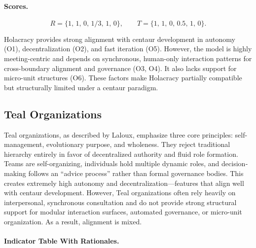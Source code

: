 \documentclass[11pt, a4paper, twocolumn]{article} %
\begin{document}
\paragraph{Scores.}

\[
R = \{1,\,1,\,0,\,1/3,\,1,\,0\},
\qquad
T = \{1,\,1,\,0,\,0.5,\,1,\,0\}.
\]

Holacracy provides strong alignment with centaur development in autonomy (O1),
decentralization (O2), and fast iteration (O5). However, the model is highly
meeting-centric and depends on synchronous, human-only interaction patterns for
cross-boundary alignment and governance (O3, O4). It also lacks support for
micro-unit structures (O6). These factors make Holacracy partially compatible
but structurally limited under a centaur paradigm.

\newpage
\subsection*{Teal Organizations}

Teal organizations, as described by Laloux, emphasize three core principles:
self-management, evolutionary purpose, and wholeness. They reject traditional
hierarchy entirely in favor of decentralized authority and fluid role formation.
Teams are self-organizing, individuals hold multiple dynamic roles, and decision­
making follows an “advice process” rather than formal governance bodies.
This creates extremely high autonomy and decentralization---features that align
well with centaur development. However, Teal organizations often rely heavily on
interpersonal, synchronous consultation and do not provide strong structural
support for modular interaction surfaces, automated governance, or micro-unit
organization. As a result, alignment is mixed.

\paragraph{Indicator Table With Rationales.}
\end{document}
